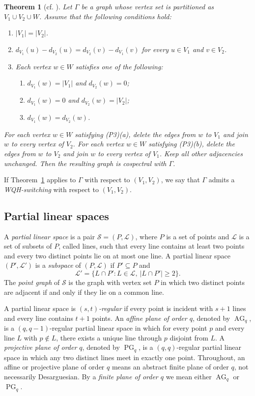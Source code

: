 \documentclass[reqno,a4paper,11pt]{article}
\newtheorem{thm}{Theorem}[section]
\theoremstyle{definition}
\theoremstyle{remark}
\newcommand{\AG}{\operatorname{AG}}
\newcommand{\PG}{\operatorname{PG}}
\begin{document}
\begin{thm}[{cf. \cite[Theorem 3.5]{WQH2019}}]\label{thm:wqh-switching}
Let $\Gamma$ be a graph whose vertex set is partitioned as $V_1\cup V_2\cup W$.
Assume that the following conditions hold:
\begin{enumerate}[label=\textup{(P\arabic*)}]
\item $|V_1|=|V_2|$.
\item $d_{V_1}(u)-d_{V_2}(u)=d_{V_2}(v)-d_{V_1}(v)$ for every $u\in V_1$ and $v\in V_2$.
\item Each vertex $w\in W$ satisfies one of the following:
\begin{enumerate}[label=\textup{(\alph*)}]
\item $d_{V_1}(w)=|V_1|$ and $d_{V_2}(w)=0$;
\item $d_{V_1}(w)=0$ and $d_{V_2}(w)=|V_2|$;
\item $d_{V_1}(w)=d_{V_2}(w)$.
\end{enumerate}
\end{enumerate}
For each vertex $w\in W$ satisfying (P3)(a), delete the edges from $w$ to $V_1$ and join $w$ to every vertex of $V_2$.
For each vertex $w\in W$ satisfying (P3)(b), delete the edges from $w$ to $V_2$ and join $w$ to every vertex of $V_1$.
Keep all other adjacencies unchanged.
Then the resulting graph is cospectral with $\Gamma$.
\end{thm}

If Theorem~\ref{thm:wqh-switching} applies to $\Gamma$ with respect to $(V_1,V_2)$, we say that $\Gamma$ admits a \emph{WQH-switching} with respect to $(V_1,V_2)$.

\subsection{Partial linear spaces}

A \emph{partial linear space} is a pair $\mathcal S=(P,\mathcal L)$, where $P$ is a set of points and $\mathcal L$ is a set of subsets of $P$, called lines, such that every line contains at least two points and every two distinct points lie on at most one line.
A partial linear space $(P',\mathcal L')$ is a \emph{subspace} of $(P,\mathcal L)$ if $P'\subseteq P$ and
\[
\mathcal L'=\{L\cap P':L\in\mathcal L,\ |L\cap P'|\ge 2\}.
\]
The \emph{point graph} of $\mathcal S$ is the graph with vertex set $P$ in which two distinct points are adjacent if and only if they lie on a common line.

A partial linear space is \emph{$(s,t)$-regular} if every point is incident with $s+1$ lines and every line contains $t+1$ points.
	An \emph{affine plane of order \(q\)}, denoted by \(\AG_q\), is a \((q,q-1)\)-regular partial linear space in which for every point \(p\) and every line \(L\) with \(p\notin L\), there exists a unique line through \(p\) disjoint from \(L\).
	A \emph{projective plane of order \(q\)}, denoted by \(\PG_q\), is a \((q,q)\)-regular partial linear space in which any two distinct lines meet in exactly one point.
Throughout, an affine or projective plane of order \(q\) means an abstract finite plane of order \(q\), not necessarily Desarguesian.
By a \emph{finite plane of order $q$} we mean either $\AG_q$ or $\PG_q$.
\end{document}
